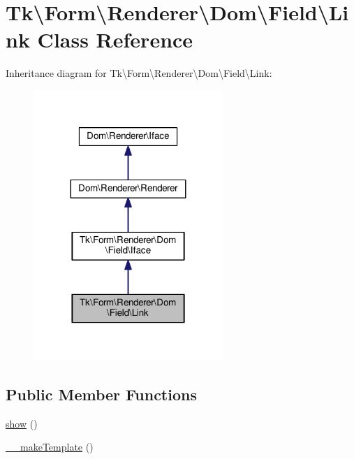 \hypertarget{classTk_1_1Form_1_1Renderer_1_1Dom_1_1Field_1_1Link}{\section{Tk\textbackslash{}Form\textbackslash{}Renderer\textbackslash{}Dom\textbackslash{}Field\textbackslash{}Link Class Reference}
\label{classTk_1_1Form_1_1Renderer_1_1Dom_1_1Field_1_1Link}
}


Inheritance diagram for Tk\textbackslash{}Form\textbackslash{}Renderer\textbackslash{}Dom\textbackslash{}Field\textbackslash{}Link\+:\nopagebreak
\begin{figure}[H]
\begin{center}
\leavevmode
\includegraphics[width=203pt]{classTk_1_1Form_1_1Renderer_1_1Dom_1_1Field_1_1Link__inherit__graph}
\end{center}
\end{figure}
\subsection*{Public Member Functions}
\begin{DoxyCompactItemize}
\item 
\hyperlink{classTk_1_1Form_1_1Renderer_1_1Dom_1_1Field_1_1Link_a30a4fe16a4d31b92bcc6d1cdb6505d22}{show} ()
\item 
\hyperlink{classTk_1_1Form_1_1Renderer_1_1Dom_1_1Field_1_1Link_a984c43a776098af1b71647cec18e3710}{\+\_\+\+\_\+make\+Template} ()
\end{DoxyCompactItemize}
